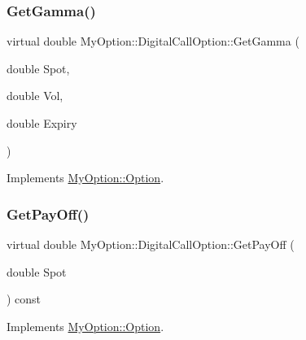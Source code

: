 \hypertarget{classMyOption_1_1DigitalCallOption_aa4fcb3de1cbeb6eea6a41149ae884402}{}\label{classMyOption_1_1DigitalCallOption_aa4fcb3de1cbeb6eea6a41149ae884402} 
\subsubsection{\texorpdfstring{Get\+Gamma()}{GetGamma()}}
{\footnotesize\ttfamily virtual double My\+Option\+::\+Digital\+Call\+Option\+::\+Get\+Gamma (\begin{DoxyParamCaption}\item[{double}]{Spot,  }\item[{double}]{Vol,  }\item[{double}]{Expiry }\end{DoxyParamCaption})\hspace{0.3cm}{\ttfamily [virtual]}}



Implements \hyperlink{classMyOption_1_1Option_a4416faa432b5004e449394056c7f1363}{My\+Option\+::\+Option}.

\hypertarget{classMyOption_1_1DigitalCallOption_a260e5ad85712e35131bf7b583d0c8525}{}\label{classMyOption_1_1DigitalCallOption_a260e5ad85712e35131bf7b583d0c8525} 
\subsubsection{\texorpdfstring{Get\+Pay\+Off()}{GetPayOff()}}
{\footnotesize\ttfamily virtual double My\+Option\+::\+Digital\+Call\+Option\+::\+Get\+Pay\+Off (\begin{DoxyParamCaption}\item[{double}]{Spot }\end{DoxyParamCaption}) const\hspace{0.3cm}{\ttfamily [virtual]}}



Implements \hyperlink{classMyOption_1_1Option_a4b6b84dc485153ffadfb32afa9bb52f3}{My\+Option\+::\+Option}.

\hypertarget{classMyOption_1_1DigitalCallOption_a9c05c136304f5b2112ed87859c5a944a}{}\label{classMyOption_1_1DigitalCallOption_a9c05c136304f5b2112ed87859c5a944a} 
